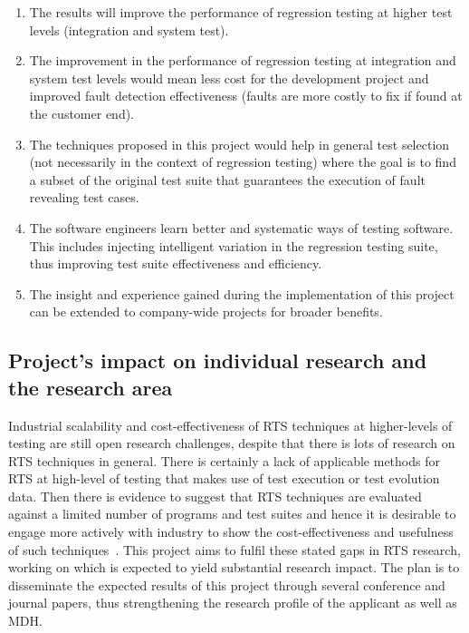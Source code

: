 \documentclass[11pt, oneside]{article}   	%
\begin{document}
\begin{enumerate}
	\item The results will improve the performance of regression testing at higher test levels (integration and system test).
	\item The improvement in the performance of regression testing at integration and system test levels would mean less cost for the development project and improved fault detection effectiveness (faults  are more costly to fix if found at the customer end).
	\item The techniques proposed in this project would help in general test selection (not necessarily in the context of regression testing) where the goal is to find a subset of the original test suite that guarantees the execution of fault revealing test cases. 
	\item The software engineers learn better and systematic ways of testing software. This includes injecting intelligent variation in the regression testing suite, thus improving test suite effectiveness and efficiency.
	\item The insight and experience gained during the implementation of this project can be extended to company-wide projects for broader benefits. 
\end{enumerate} 
	
\subsection{Project's impact on individual research and the research area}\label{sec:impact_research}
Industrial scalability and cost-effectiveness of RTS techniques at higher-levels of testing are still open research challenges, despite that there is lots of research on RTS techniques in general. There is certainly a lack of applicable methods for RTS at high-level of testing that makes use of test execution or test evolution data. Then there is evidence to suggest that RTS techniques are evaluated against a limited number of programs and test suites and hence it is desirable to engage more actively with industry to show the cost-effectiveness and usefulness of such techniques~\cite{Yoo12}. This project aims to fulfil these stated gaps in RTS research, working on which is expected to yield substantial research impact. The plan is to disseminate the expected results of this project through several conference and journal papers, thus strengthening the research profile of the applicant as well as MDH.
\end{document}
